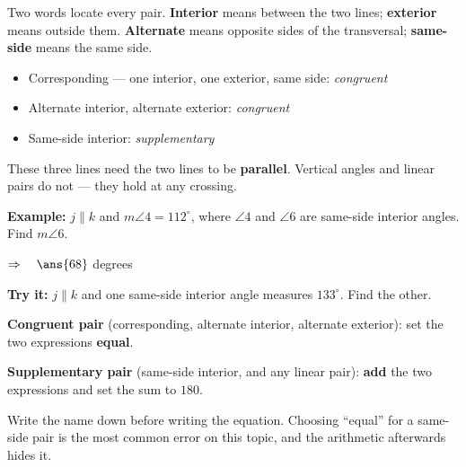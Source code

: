 \documentclass[12pt]{article}
\begin{document}


\begin{formulabox}
Two words locate every pair. \textbf{Interior} means between the two lines; \textbf{exterior} means outside them. \textbf{Alternate} means opposite sides of the transversal; \textbf{same-side} means the same side.\par
\begin{itemize}[leftmargin=1.2cm, itemsep=0pt, topsep=1pt]
  \item Corresponding --- one interior, one exterior, same side: \emph{congruent}
  \item Alternate interior, alternate exterior: \emph{congruent}
  \item Same-side interior: \emph{supplementary}
\end{itemize}
These three lines need the two lines to be \textbf{parallel}. Vertical angles and linear pairs do not --- they hold at any crossing.
\end{formulabox}

\begin{examplebox}
\textbf{Example:} \quad $j \parallel k$ and $m\angle 4 = 112^\circ$, where $\angle 4$ and $\angle 6$ are same-side interior angles. Find $m\angle 6$.

$\Rightarrow\quad \ans{68}$ degrees
\end{examplebox}

\begin{tryitbox}
\textbf{Try it:} \quad $j \parallel k$ and one same-side interior angle measures $133^\circ$. Find the other.\\[2pt]
\end{tryitbox}


\begin{formulabox}
\textbf{Congruent pair} (corresponding, alternate interior, alternate exterior): set the two expressions \textbf{equal}.\par
\textbf{Supplementary pair} (same-side interior, and any linear pair): \textbf{add} the two expressions and set the sum to $180$.\par
Write the name down before writing the equation. Choosing ``equal'' for a same-side pair is the most common error on this topic, and the arithmetic afterwards hides it.
\end{formulabox}
\end{document}
